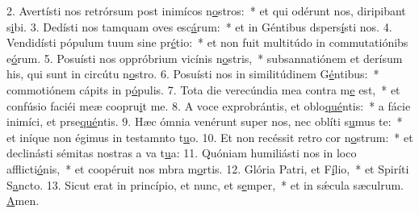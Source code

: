 2. Avertísti nos retrórsum post inimícos n\uline{o}stros:~* et qui odérunt nos, diripibant s\uline{i}bi.
3. Dedísti nos tamquam oves esc\uline{á}rum:~* et in Géntibus dspers\uline{í}sti nos.
4. Vendidísti pópulum tuum sine pr\uline{é}tio:~* et non fuit multitúdo in commutatiónibs e\uline{ó}rum.
5. Posuísti nos oppróbrium vicínis n\uline{o}stris,~* subsannatiónem et derísum his, qui sunt in circútu n\uline{o}stro.
6. Posuísti nos in similitúdinem G\uline{é}ntibus:~* commotiónem cápits in p\uline{ó}pulis.
7. Tota die verecúndia mea contra m\uline{e} est,~* et confúsio faciéi meæ coopru\uline{i}t me.
8. A voce exprobrántis, et oblo\uline{qué}ntis:~* a fácie inimíci, et prse\uline{qué}ntis.
9. Hæc ómnia venérunt super nos, nec oblíti s\uline{u}mus te:~* et iníque non égimus in testamnto t\uline{u}o.
10. Et non recéssit retro cor n\uline{o}strum:~* et declinásti sémitas nostras a va t\uline{u}a:
11. Quóniam humiliásti nos in loco afflicti\uline{ó}nis,~* et coopéruit nos mbra m\uline{o}rtis.
12. Glória Patri, et F\uline{í}lio,~* et Spiríti S\uline{a}ncto.
13. Sicut erat in princípio, et nunc, et s\uline{e}mper,~* et in sǽcula sæculrum. \uline{A}men.
